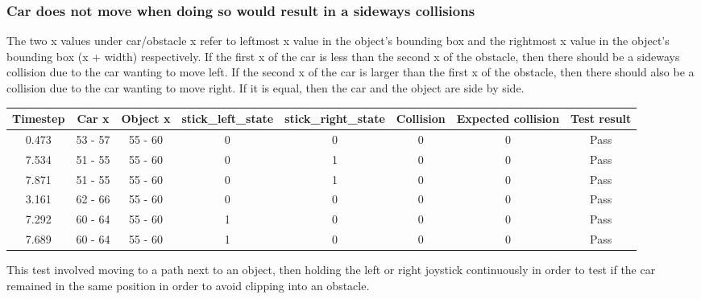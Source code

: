 \documentclass{article}
\begin{document}
\subsubsection*{Car does not move when doing so would result in a sideways collisions}
The two x values under car/obstacle x refer to leftmost x value in the object's bounding box and the rightmost x value in the object's bounding box (x + width) respectively. If the first x of the car is less than the second x of the obstacle, then there should be a sideways collision due to the car wanting to move left. If the second x of the car is larger than the first x of the obstacle, then there should also be a collision due to the car wanting to move right. If it is equal, then the car and the object are side by side.
\begin{center}
\begin{tabular}{ c c c c c c c c }
Timestep	& Car x 	& Object x 	& stick\_left\_state	& stick\_right\_state	& Collision 	& Expected collision	& Test result	\\ \hline
0.473		& 53 - 57	& 55 - 60	& 0			& 0				& 0		& 0 			& Pass	\\
7.534		& 51 - 55	& 55 - 60	& 0			& 1				& 0		& 0 			& Pass	\\
7.871		& 51 - 55	& 55 - 60	& 0			& 1				& 0		& 0 			& Pass	\\
3.161		& 62 - 66	& 55 - 60	& 0			& 0				& 0 		& 0 			& Pass	\\
7.292		& 60 - 64	& 55 - 60	& 1			& 0				& 0		& 0			& Pass 	\\
7.689		& 60 - 64	& 55 - 60	& 1			& 0				& 0		& 0			& Pass 	\\ \hline
\end{tabular}
\end{center}
This test involved moving to a path next to an object, then holding the left or right joystick continuously in order to test if the car remained in the same position in order to avoid clipping into an obstacle.
\end{document}

